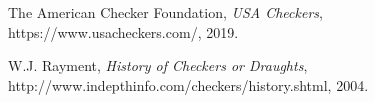 \documentclass[10pt]{article}
\begin{document}
\begin{thebibliography}{9}

  The American Checker Foundation,
  \textit{USA Checkers},
  https://www.usacheckers.com/,
  2019.

W.J. Rayment,
\textit{History of Checkers or Draughts},
http://www.indepthinfo.com/checkers/history.shtml,
2004.

\end{thebibliography}
\end{document}
